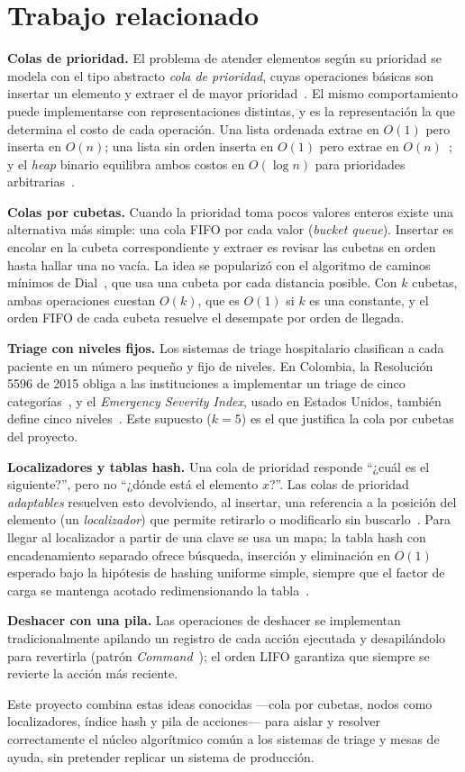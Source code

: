 \section{Trabajo relacionado}
\label{sec:relacionado}

\textbf{Colas de prioridad.} El problema de atender elementos según su
prioridad se modela con el tipo abstracto \emph{cola de prioridad}, cuyas
operaciones básicas son insertar un elemento y extraer el de mayor
prioridad~\cite{cormen,goodrich}. El mismo comportamiento puede
implementarse con representaciones distintas, y es la representación la que
determina el costo de cada operación. Una lista ordenada extrae en $O(1)$
pero inserta en $O(n)$; una lista sin orden inserta en $O(1)$ pero extrae en
$O(n)$~\cite{goodrich}; y el \emph{heap} binario equilibra ambos costos en
$O(\log n)$ para prioridades arbitrarias~\cite{cormen}.

\textbf{Colas por cubetas.} Cuando la prioridad toma pocos valores enteros
existe una alternativa más simple: una cola FIFO por cada valor
(\emph{bucket queue}). Insertar es encolar en la cubeta correspondiente y
extraer es revisar las cubetas en orden hasta hallar una no vacía. La idea
se popularizó con el algoritmo de caminos mínimos de Dial~\cite{dial}, que
usa una cubeta por cada distancia posible. Con $k$ cubetas, ambas
operaciones cuestan $O(k)$, que es $O(1)$ si $k$ es una constante, y el
orden FIFO de cada cubeta resuelve el desempate por orden de llegada.

\textbf{Triage con niveles fijos.} Los sistemas de triage hospitalario
clasifican a cada paciente en un número pequeño y fijo de niveles. En
Colombia, la Resolución 5596 de 2015 obliga a las instituciones a
implementar un triage de cinco categorías~\cite{minsalud}, y el
\emph{Emergency Severity Index}, usado en Estados Unidos, también define
cinco niveles~\cite{esi}. Este supuesto ($k=5$) es el que justifica la cola
por cubetas del proyecto.

\textbf{Localizadores y tablas hash.} Una cola de prioridad responde
``¿cuál es el siguiente?'', pero no ``¿dónde está el elemento $x$?''. Las
colas de prioridad \emph{adaptables} resuelven esto devolviendo, al
insertar, una referencia a la posición del elemento (un \emph{localizador})
que permite retirarlo o modificarlo sin buscarlo~\cite{goodrich}. Para
llegar al localizador a partir de una clave se usa un mapa; la tabla hash
con encadenamiento separado ofrece búsqueda, inserción y eliminación en
$O(1)$ esperado bajo la hipótesis de hashing uniforme simple, siempre que
el factor de carga se mantenga acotado redimensionando la
tabla~\cite{cormen}.

\textbf{Deshacer con una pila.} Las operaciones de deshacer se implementan
tradicionalmente apilando un registro de cada acción ejecutada y
desapilándolo para revertirla (patrón \emph{Command}~\cite{gof}); el orden
LIFO garantiza que siempre se revierte la acción más reciente.

Este proyecto combina estas ideas conocidas ---cola por cubetas, nodos como
localizadores, índice hash y pila de acciones--- para aislar y resolver
correctamente el núcleo algorítmico común a los sistemas de triage y mesas
de ayuda, sin pretender replicar un sistema de producción.
